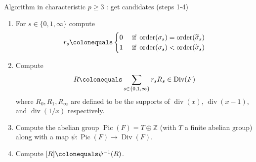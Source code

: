 \documentclass[handout,xcolor=dvipsnames]{beamer}
\theoremstyle{plain}
\newcommand{\ZZ}{\mathbb Z}
\newcommand{\wt}[1]{\widetilde{#1}}
\DeclareMathOperator{\Div}{Div}
\DeclareMathOperator{\Pic}{Pic}
\DeclareMathOperator{\ddiv}{div}
\DeclareMathOperator{\order}{order}
\begin{document}
  \begin{frame}{Algorithm in characteristic $p\geq 3$ : get candidates (steps 1-4)}
    \begin{enumerate}
      \item[1.]
        For $s\in\{0,1,\infty\}$
        compute
        \begin{align*}
          r_s\colonequals
          \begin{cases}
            0&
            \text{ if }
            \order(\sigma_s)=
            \order(\wt{\sigma}_s)\\
            1&
            \text{ if }
            \order(\sigma_s)<
            \order(\wt{\sigma}_s)\\
          \end{cases}
        \end{align*}
      \item[2.]
        Compute
        \begin{equation*}
          R\colonequals
          \sum_{s\in\{0,1,\infty\}}r_sR_s
          \in\Div(F)
        \end{equation*}
        where
        $R_0,R_1,R_\infty$
        are defined to be the supports
        of
        $\ddiv(x)$,
        $\ddiv(x-1)$,
        and $\ddiv(1/x)$
        respectively.
      \item[3.]
        Compute the abelian group
        $\Pic(F)=T\oplus\ZZ$
        (with $T$ a finite abelian group)
        along with a map
        $\psi\colon\Pic(F)\to\Div(F)$.
      \item[4.]
        Compute
        $[R]\colonequals\psi^{-1}(R)$.
    \end{enumerate}
  \end{frame}
\end{document}

